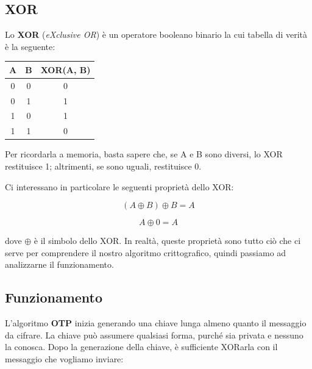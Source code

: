 \documentclass{report}
\begin{document}
\subsection{XOR}
Lo \textbf{XOR} (\textit{eXclusive OR}) è un operatore booleano binario la cui tabella di verità è la seguente:

\begin{center}
\begin{table}[h]
\centering
\begin{tabular}{c|c|c}
A & B & XOR(A, B) \\
\hline
0 & 0 & 0         \\
0 & 1 & 1         \\
1 & 0 & 1         \\
1 & 1 & 0         \\
\end{tabular}
\end{table}
\end{center}

Per ricordarla a memoria, basta sapere che, se A e B sono diversi, lo XOR restituisce 1; altrimenti, se sono uguali, restituisce 0.

Ci interessano in particolare le seguenti proprietà dello XOR:

\begin{equation*} (A \oplus B) \oplus B = A \end{equation*}

\begin{equation*} A \oplus 0 = A \end{equation*}

dove $\oplus$ è il simbolo dello XOR. In realtà, queste proprietà sono tutto ciò che ci serve per comprendere il nostro algoritmo crittografico, quindi passiamo ad analizzarne il funzionamento.















\newpage
\subsection{Funzionamento}
L'algoritmo \textbf{OTP} inizia generando una chiave lunga almeno quanto il messaggio da cifrare. La chiave può assumere qualsiasi forma, purché sia privata e nessuno la conosca. Dopo la generazione della chiave, è sufficiente XORarla con il messaggio che vogliamo inviare:  
\end{document}

